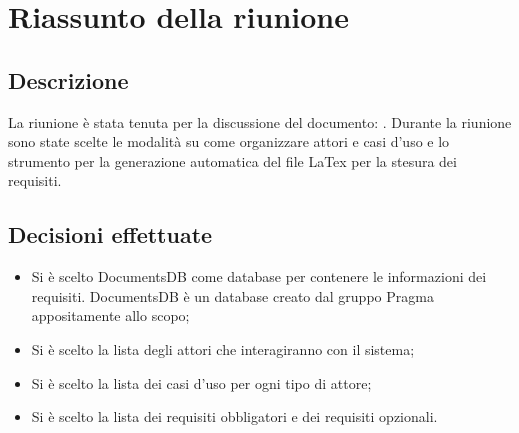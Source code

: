 \section{Riassunto della riunione}
\subsection{Descrizione}

La riunione è stata tenuta per la discussione del documento: \AdR. Durante la riunione sono state scelte le modalità su come organizzare attori e casi d'uso e lo strumento per la generazione automatica del file LaTex per la stesura dei requisiti.

\subsection{Decisioni effettuate}
\begin{itemize}
\item Si è scelto DocumentsDB come database per contenere le informazioni dei requisiti. DocumentsDB è un database creato dal gruppo Pragma appositamente allo scopo;
\item Si è scelto la lista degli attori che interagiranno con il sistema;
\item Si è scelto la lista dei casi d'uso per ogni tipo di attore;
\item Si è scelto la lista dei requisiti obbligatori e dei requisiti opzionali.
\end{itemize}